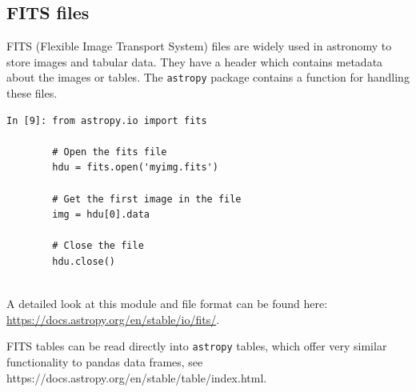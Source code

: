 \begin{tcolorbox}[colback=red!5!white,colframe=red!75!black]
\subsection{FITS files}

FITS (Flexible Image Transport System) files are widely used in astronomy to store images and tabular data. They have a header which contains metadata about the images or tables. The \texttt{astropy} package contains a function for handling these files.

\begin{lstlisting}[style=PY]
In [9]: from astropy.io import fits
        
        # Open the fits file
        hdu = fits.open('myimg.fits')
        
        # Get the first image in the file
        img = hdu[0].data
        
        # Close the file
        hdu.close()
            
\end{lstlisting}

A detailed look at this module and file format can be found here: \url{https://docs.astropy.org/en/stable/io/fits/}.

FITS tables can be read directly into {\tt astropy} tables,
which offer very similar functionality to pandas data frames,
see https://docs.astropy.org/en/stable/table/index.html.

\end{tcolorbox}

